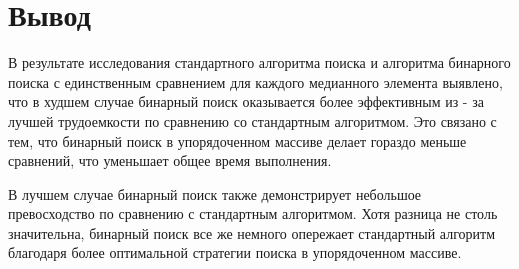 \section*{Вывод}

В результате исследования стандартного алгоритма поиска и алгоритма бинарного поиска с единственным сравнением для каждого медианного элемента выявлено, что в худшем случае бинарный поиск оказывается более эффективным из - за лучшей трудоемкости по сравнению со стандартным алгоритмом. 
Это связано с тем, что бинарный поиск в упорядоченном массиве делает гораздо меньше сравнений, что уменьшает общее время выполнения.

В лучшем случае бинарный поиск также демонстрирует небольшое превосходство по сравнению с стандартным алгоритмом. 
Хотя разница не столь значительна, бинарный поиск все же немного опережает стандартный алгоритм благодаря более оптимальной стратегии поиска в упорядоченном массиве.
